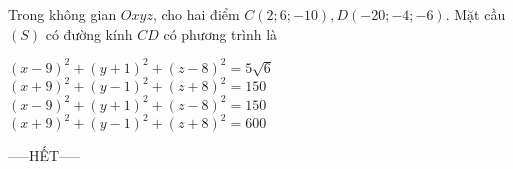 \documentclass[12pt,a4paper]{article}
\begin{document}
\begin{ex}
 Trong không gian ${Oxyz}$, cho hai điểm $C(2;6;-10),D(-20;-4;-6)$. Mặt cầu ${(S)}$ có đường kính ${CD}$ có phương trình là
 
\choice
{ $\left(x - 9\right)^{2}+\left(y + 1\right)^{2}+\left(z - 8\right)^{2}=5 \sqrt{6}$ }
   { \True $\left(x + 9\right)^{2}+\left(y - 1\right)^{2}+\left(z + 8\right)^{2}=150$ }
     { $\left(x - 9\right)^{2}+\left(y + 1\right)^{2}+\left(z - 8\right)^{2}=150$ }
    { $\left(x + 9\right)^{2}+\left(y - 1\right)^{2}+\left(z + 8\right)^{2}=600$ }
\end{ex}


 \begin{center}
-----HẾT-----
\end{center}

\end{document}
